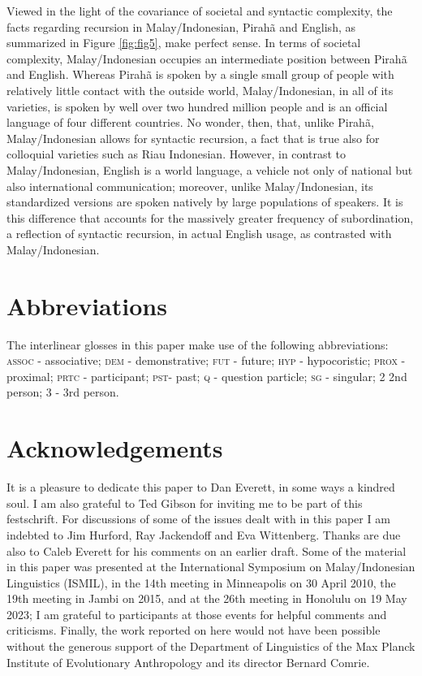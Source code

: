 \documentclass[output=paper,colorlinks,citecolor=brown
]{langscibook}
\begin{document}
Viewed in the light of the covariance of societal and syntactic complexity, the facts regarding recursion in Malay/Indonesian, Pirahã and English, as summarized in Figure \ref{fig:fig5}, make perfect sense.  In terms of societal complexity, Malay/Indonesian occupies an intermediate position between Pirahã and English.  Whereas Pirahã is spoken by a single small group of people with relatively little contact with the outside world, Malay/Indonesian, in all of its varieties, is spoken by well over two hundred million people and is an official language of four different countries.  No wonder, then, that, unlike Pirahã, Malay/Indonesian allows for syntactic recursion, a fact that is true also for colloquial varieties such as Riau Indonesian.  However, in contrast to Malay/Indonesian, English is a world language, a vehicle not only of national but also international communication; moreover, unlike Malay/Indonesian, its standardized versions are spoken natively by large populations of speakers.  It is this difference that accounts for the massively greater frequency of subordination, a reflection of syntactic recursion, in actual English usage, as contrasted with Malay/Indonesian. 

\section*{Abbreviations}
The interlinear glosses in this paper make use of the following abbreviations: \textsc{assoc} - associative; \textsc{dem} - demonstrative; \textsc{fut} - future; \textsc{hyp} - hypocoristic; \textsc{prox} - proximal; \textsc{prtc} - participant; \textsc{pst}- past; \textsc{q} - question particle; \textsc{sg} - singular; 2   2nd person; 3 - 3rd person.

\section*{Acknowledgements}
It is a pleasure to dedicate this paper to Dan Everett, in some ways a kindred soul.  I am also grateful to Ted Gibson for inviting me to be part of this festschrift.  For discussions of some of the issues dealt with in this paper I am indebted to Jim Hurford, Ray Jackendoff and Eva Wittenberg.  Thanks are due also to Caleb Everett for his comments on an earlier draft.  Some of the material in this paper was presented at the International Symposium on Malay/Indonesian Linguistics (ISMIL), in the 14th meeting in Minneapolis on 30 April 2010, the 19th meeting in Jambi on 2015, and at the 26th meeting in Honolulu on 19 May 2023; I am grateful to participants at those events for helpful comments and criticisms.  Finally, the work reported on here would not have been possible without the generous support of the Department of Linguistics of the Max Planck Institute of Evolutionary Anthropology and its director Bernard Comrie.

\sloppy
\printbibliography[heading=subbibliography,notkeyword=this]
\end{document}
